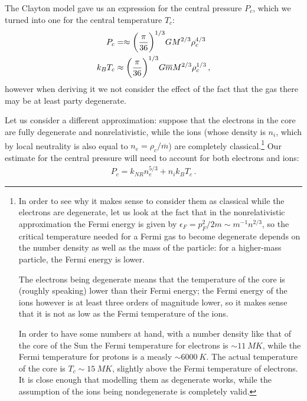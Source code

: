 \documentclass[main.tex]{subfiles}
\begin{document}

The Clayton model gave us an expression for the central pressure \(P_c\), which we turned into one for the central temperature \(T_c\): 
%
\begin{align}
P_c &=\approx \qty(\frac{\pi }{36})^{1/3} G M^{2/3} \rho _c^{4/3} \\
 k_B T_c &\approx \qty(\frac{\pi }{36})^{1/3} G \overline{m}
  M^{2/3} \rho _c^{1/3}
\,,
\end{align}
%
however when deriving it we not consider the effect of the fact that the gas there may be at least party degenerate.

Let us consider a different approximation: suppose that the electrons in the core are fully degenerate and nonrelativistic, while the ions (whose density is \(n_i\), which by local neutrality is also equal to \(n_e = \rho _c / \overline{m}\)) are completely classical.\footnote{In order to see why it makes sense to consider them as classical while the electrons are degenerate, let us look at the fact that in the nonrelativistic approximation the Fermi energy is given by \(\epsilon _F = p_F^2 / 2m \sim m^{-1} n^{2/3}\), so the critical temperature needed for a Fermi gas to become degenerate depends on the number density as well as the mass of the particle: for a higher-mass particle, the Fermi energy is lower.

The electrons being degenerate means that the temperature of the core is (roughly speaking) lower than their Fermi energy; the Fermi energy of the ions however is at least three orders of magnitude lower, so it makes sense that it is not as low as the Fermi temperature of the ions.

In order to have some numbers at hand, with a number density like that of the core of the Sun the Fermi temperature for electrons is \(\sim \SI{11}{MK}\), while the Fermi temperature for protons is a measly \(\sim \SI{6000}{K}\). The actual temperature of the core is \(T_c \sim \SI{15}{MK}\), slightly above the Fermi temperature of electrons. It is close enough that modelling them as degenerate works, while the assumption of the ions being nondegenerate is completely valid.}
Our estimate for the central pressure will need to account for both electrons and ions:
%
\begin{align}
  P_c = k_{NR} n_{e}^{5/3} + n_i k_B T_c
\,.
\end{align}
%
\end{document}
